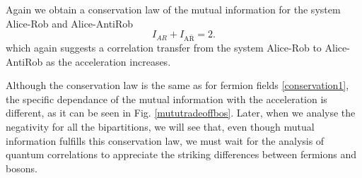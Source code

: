 Again we obtain a conservation law of the mutual information for the system Alice-Rob and Alice-AntiRob
\begin{equation}\label{conservationbos}
 I_{AR} + I_{\text{A}{\bar{\text{R}}}}=2.
\end{equation}
which again suggests a correlation transfer from the system Alice-Rob to Alice-AntiRob as the acceleration increases.

Although the conservation law is the same as for fermion fields \eqref{conservation1}, the specific dependance of the mutual information with the acceleration is different, as it can be seen in Fig. \ref{mututradeoffbos}. Later, when we analyse the negativity for all the bipartitions, we will see that, even though mutual information fulfills this conservation law, we must wait for the analysis of quantum correlations to appreciate the striking differences between fermions and bosons.  

